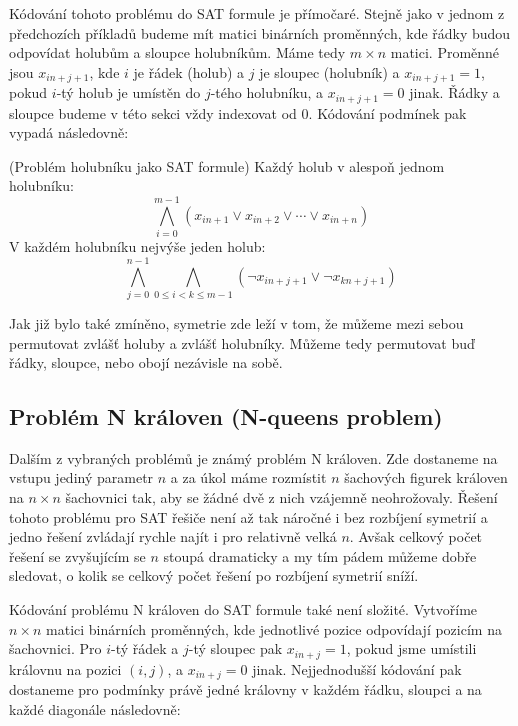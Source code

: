 Kódování tohoto problému do SAT formule je přímočaré. Stejně jako v jednom z předchozích příkladů budeme mít matici binárních proměnných, kde řádky budou odpovídat holubům a sloupce holubníkům. Máme tedy $m\times n$ matici. Proměnné jsou $x_{in+j+1}$, kde $i$ je řádek (holub) a $j$ je sloupec (holubník) a $x_{in+j+1} = 1$, pokud $i$-tý holub je umístěn do $j$-tého holubníku, a $x_{in+j+1}=0$ jinak. Řádky a sloupce budeme v této sekci vždy indexovat od $0$. Kódování podmínek pak vypadá následovně:

\begin{pozn}{(Problém holubníku jako SAT formule)}
Každý holub v alespoň jednom holubníku: \[
\bigwedge_{i=0}^{m-1}
\left(
x_{in+1} \vee x_{in+2} \vee \cdots \vee x_{in+n}
\right)
\]
V každém holubníku nejvýše jeden holub: 
\[
\bigwedge_{j=0}^{n-1}
\bigwedge_{0 \le i < k \le m-1}
\left(
\neg x_{in+j+1} \vee \neg x_{kn+j+1}
\right)
\]
\end{pozn}

Jak již bylo také zmíněno, symetrie zde leží v tom, že můžeme mezi sebou permutovat zvlášť holuby a zvlášť holubníky. Můžeme tedy permutovat buď řádky, sloupce, nebo obojí nezávisle na sobě.

\subsection{Problém N královen (N-queens problem)}
Dalším z vybraných problémů je známý problém N královen. Zde dostaneme na vstupu jediný parametr $n$ a za úkol máme rozmístit $n$ šachových figurek královen na $n\times n$ šachovnici tak, aby se žádné dvě z nich vzájemně neohrožovaly. Řešení tohoto problému pro SAT řešiče není až tak náročné i bez rozbíjení symetrií a jedno řešení zvládají rychle najít i pro relativně velká $n$. Avšak celkový počet řešení se zvyšujícím se $n$ stoupá dramaticky a my tím pádem můžeme dobře sledovat, o kolik se celkový počet řešení po rozbíjení symetrií sníží.

Kódování problému N královen do SAT formule také není složité. Vytvoříme $n\times n$ matici binárních proměnných, kde jednotlivé pozice odpovídají pozicím na šachovnici. Pro $i$-tý řádek a $j$-tý sloupec pak $x_{in+j} = 1$, pokud jsme umístili královnu na pozici $(i, j)$, a $x_{in+j}=0$ jinak. Nejjednodušší kódování pak dostaneme pro podmínky právě jedné královny v každém řádku, sloupci a na každé diagonále následovně:


